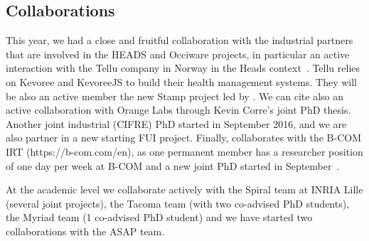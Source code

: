 \subsection*{Collaborations}

This year,  we had a close and fruitful collaboration with the industrial partners that are involved in the HEADS and Occiware projects, in particular an active interaction  with the Tellu company in Norway in the Heads context~\cite{hal-01356104}. 
Tellu relies on Kevoree and KevoreeJS to build their health management systems. 
They will be also an active member the new Stamp project led by \team{}. 
We can cite also an active collaboration with Orange Labs through Kevin Corre's joint PhD thesis. 
Another joint industrial (CIFRE) PhD started in September 2016, and we are also partner in a new starting FUI project. 
Finally, \team{} collaborates with the B-COM IRT (https://b-com.com/en), 
as one permanent member has a researcher position of one day per week at B-COM and a new joint PhD started in September~\cite{outin:hal-01356099}. 

At the academic level we collaborate actively with the Spiral team at INRIA Lille (several joint projects), the Tacoma team (with two co-advised PhD students), the Myriad team (1 co-advised PhD student) and we have started two collaborations with the ASAP team.





